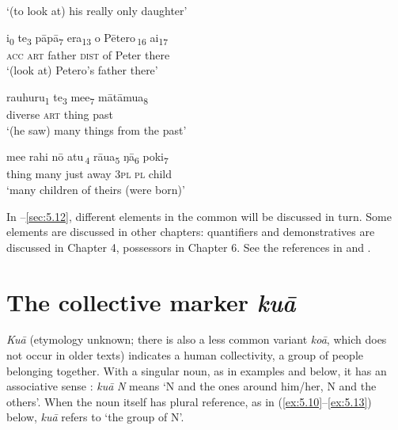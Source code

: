 \glt 
‘(to look at) his really only daughter’ \textstyleExampleref{[Luke 8:41-42]}
\z

\ea\label{ex:5.5}
\gll i\textsubscript{0} te\textsubscript{3} pāpā\textsubscript{7} era\textsubscript{13} {\ob}o Pētero\,{\cb}\textsubscript{16} ai\textsubscript{17}\\
\textsc{acc} \textsc{art} father \textsc{dist} {\db}of Peter there\\

\glt 
‘(look at) Petero’s father there’ \textstyleExampleref{[Notes]}
\z

\ea\label{ex:5.6}
\gll rauhuru\textsubscript{1} te\textsubscript{3} me{\ꞌ}e\textsubscript{7} mātāmu{\ꞌ}a\textsubscript{8}\\
diverse \textsc{art} thing past\\

\glt 
‘(he saw) many things from the past’ \textstyleExampleref{[R423.021]}
\z

\ea\label{ex:5.7}
\gll {\ob}me{\ꞌ}e rahi nō atu\,{\cb}\textsubscript{4} rāua\textsubscript{5} ŋā\textsubscript{6} poki\textsubscript{7}  \\
{\ob}thing many just away \textsc{3pl} \textsc{pl} child  \\

\glt 
‘many children of theirs (were born)’ \textstyleExampleref{[R438.049]} 
\z

In –\ref{sec:5.12}, different elements in the common  will be discussed in turn. Some elements are discussed in other chapters: quantifiers and demonstratives are discussed in Chapter 4, possessors in Chapter 6. See the references in  and .

\section{The collective marker \textit{kuā}}\label{sec:5.2}
\textit{Kuā} (etymology unknown; there is also a less common variant \textit{koā}, which does not occur in older texts) indicates a human collectivity, a group of people belonging together. With a singular noun, as in examples  and  below, it has an associative sense \citep[50]{Dixon2012}: \textit{kuā} \textit{N} means ‘N and the ones around him/her, N and the others’. When the noun itself has plural reference, as in (\ref{ex:5.10}–\ref{ex:5.13}) below, \textit{kuā} refers to ‘the group of N’.


